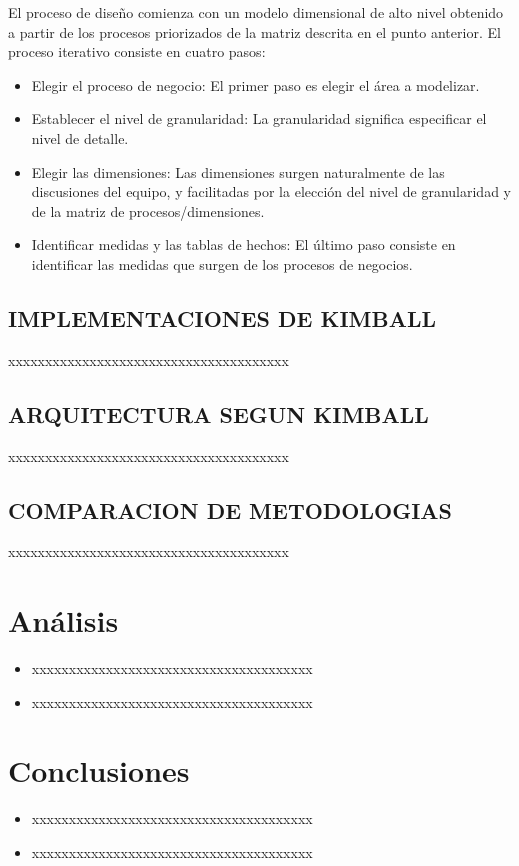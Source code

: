\documentclass[%
 reprint,
 amsmath,amssymb,
 aps,
]{revtex4-1}
\begin{document}
El proceso de diseño comienza con un modelo dimensional de alto nivel obtenido a partir de los procesos priorizados de la matriz descrita en el punto anterior.
El proceso iterativo consiste en cuatro pasos:

\begin{itemize}
	\item Elegir el proceso de negocio: El primer paso es elegir el área a modelizar. 
    \item Establecer el nivel de granularidad: La granularidad significa especificar el nivel de detalle.
    \item Elegir las dimensiones: Las dimensiones surgen naturalmente de las discusiones del equipo, y facilitadas por la elección del nivel de granularidad y de la matriz de procesos/dimensiones. 
    \item Identificar medidas y las tablas de hechos: El último paso consiste en identificar las medidas que surgen de los procesos de negocios.
\end{itemize}

\subsection{IMPLEMENTACIONES DE KIMBALL}
xxxxxxxxxxxxxxxxxxxxxxxxxxxxxxxxxxxxxx 

\subsection{ARQUITECTURA SEGUN KIMBALL}

xxxxxxxxxxxxxxxxxxxxxxxxxxxxxxxxxxxxxx 


\subsection{COMPARACION DE METODOLOGIAS}	
xxxxxxxxxxxxxxxxxxxxxxxxxxxxxxxxxxxxxx

\section{Análisis}

\begin{itemize}
\item xxxxxxxxxxxxxxxxxxxxxxxxxxxxxxxxxxxxxx 
\item xxxxxxxxxxxxxxxxxxxxxxxxxxxxxxxxxxxxxx 
\end{itemize}
\section{Conclusiones}

\begin{itemize}
\item xxxxxxxxxxxxxxxxxxxxxxxxxxxxxxxxxxxxxx 
\item xxxxxxxxxxxxxxxxxxxxxxxxxxxxxxxxxxxxxx 

\end{itemize}






\end{document}

